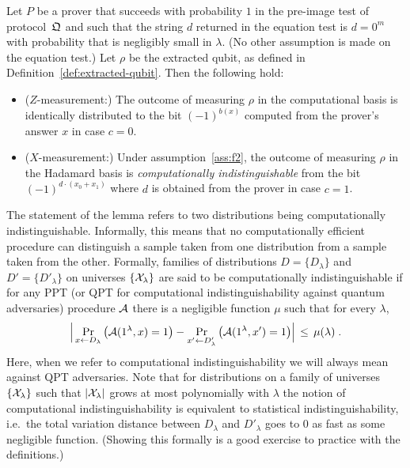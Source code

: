 \begin{lemma}\label{lem:comp-ind-qubits}
Let $P$ be a prover that succeeds with probability $1$ in the pre-image test of  protocol~$\mathfrak{Q}$ and such that the string $d$ returned in the equation test is $d=0^m$ with probability that is negligibly small in $\lambda$. (No other assumption is made on the equation test.) Let $\rho$ be the extracted qubit, as defined in Definition~\ref{def:extracted-qubit}. Then the following hold:
\begin{itemize}
\item ($Z$-measurement:) The outcome of measuring $\rho$ in the computational basis is identically distributed to the bit $(-1)^{b(x)}$ computed from the prover's answer $x$ in case $c=0$.
\item ($X$-measurement:) Under assumption~\ref{ass:f2}, the outcome of measuring $\rho$ in the Hadamard basis is \emph{computationally indistinguishable} from the bit $(-1)^{d\cdot(x_0+x_1)}$ where $d$ is obtained from the prover in case $c=1$.
\end{itemize}
\end{lemma}

\begin{remark}\label{rk:comp-dist}
The statement of the lemma refers to two distributions being computationally indistinguishable. Informally, this means that no computationally efficient procedure can distinguish a sample taken from one distribution from a sample taken from the other. Formally, families of distributions $D = \{D_\lambda\}$ and $D' = \{D'_\lambda\}$ on universes $\{\mathcal{X}_\lambda\}$ are said to be  computationally indistinguishable if for any PPT (or QPT for computational indistinguishability against quantum adversaries) procedure $\mathcal{A}$ there is a negligible function $\mu$ such that for every $\lambda$,
\[ \Big|\Pr_{x\leftarrow D_\lambda}\big( \mathcal{A}(1^\lambda,x)=1\big) - \Pr_{x' \leftarrow D'_\lambda}\big(\mathcal{A}(1^\lambda,x')=1\big)\Big|\,\leq\, \mu(\lambda)\;.\]
Here, when we refer to computational indistinguishability we will always mean against QPT adversaries. Note that for distributions on a family of universes $\{\mathcal{X}_\lambda\}$ such that $|\mathcal{X}_\lambda|$ grows at most polynomially with $\lambda$ the notion of computational indistinguishability is equivalent to statistical indistinguishability, i.e.\ the total variation distance between $D_\lambda$ and $D'_\lambda$ goes to $0$ as fast as some negligible function. (Showing this formally is a good exercise to practice with the definitions.)
\end{remark}



